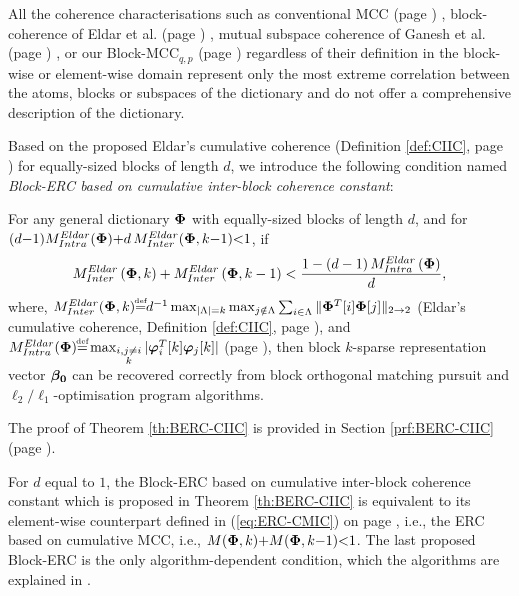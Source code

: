 All the coherence characterisations such as conventional MCC (page \pageref{eq:MIC}) \cite{Donoho2001}, %
block-coherence of Eldar et al. (page \pageref{eq:Eldar-Block-coherence}) \cite{Eldar2010}, 
mutual subspace coherence of Ganesh et al. (page \pageref{eq:MSubC}) \cite{Ganesh2009}, or our Block-MCC$_{q,p}$ (page \pageref{def:BMIC}) regardless of their definition in the block-wise or element-wise domain represent only the most extreme correlation between the atoms, blocks or subspaces of the dictionary and do not offer a comprehensive description of the dictionary.

Based on the proposed Eldar’s cumulative coherence (Definition \ref{def:CIIC}, page \pageref{def:CIIC}) for equally-sized blocks of length $d$, we introduce the following condition named \emph{Block-ERC based on cumulative inter-block coherence constant}:
\begin{tcolorbox}
\begin{theorem}
\label{th:BERC-CIIC}
For any general dictionary $\boldsymbol{\Phi}$ with equally-sized blocks of length $d$, and for $(d {-} 1) M^{Eldar}_{Intra}(\boldsymbol{\Phi}) {+} d \, M^{Eldar}_{Inter}(\boldsymbol{\Phi} , k {-} 1) {<} 1$, if 
\begin{gather*}
M_{Inter}^{Eldar}\left( \boldsymbol{\Phi} , k \right) + M_{Inter}^{Eldar}\left( \boldsymbol{\Phi} , k-1 \right) < \frac{1-\left( d-1 \right)M_{Intra}^{Eldar}\left( \boldsymbol{\Phi} \right)}{d}, 
\end{gather*}
where, $M_{Inter}^{Eldar} (\myPhi , k) {\myeq} d^{-1} \max_{\vert \Lambda \vert =k} \max_{j \notin \Lambda} \sum_{i \in \Lambda} \Vert \myPhi^T [i] \myPhi [j] \Vert_{2 \to 2}$ (Eldar's cumulative coherence, Definition \ref{def:CIIC}, page \pageref{def:CIIC}), and $M^{Eldar}_{Intra} (\myPhi) {\myeq} \max_{\substack{i,j \neq i \\ k}} \vert \myphi_i ^T [k] \myphi_j [k] \vert$ (page \pageref{eq:Eldar-Block-coherence}), then block $k$-sparse representation vector $\boldsymbol{\beta_0}$ can be recovered correctly from block orthogonal matching pursuit and $\ell_2/\ell_1$-optimisation program algorithms.
\end{theorem}
\end{tcolorbox}
The proof of Theorem \ref{th:BERC-CIIC} is provided in Section \ref{prf:BERC-CIIC} (page \pageref{prf:BERC-CIIC}).

For $d$ equal to $1$, the Block-ERC based on cumulative inter-block coherence constant which is proposed in Theorem \ref{th:BERC-CIIC} is equivalent to its element-wise counterpart defined in (\ref{eq:ERC-CMIC}) on page \pageref{eq:ERC-CMIC}, i.e., the ERC based on cumulative MCC, i.e., $M (\boldsymbol{\Phi} , k) {+} M (\boldsymbol{\Phi} , k {-} 1) {<} 1$. 
The last proposed Block-ERC is the only algorithm-dependent condition, which the algorithms are explained in \cite{Eldar2009b}.